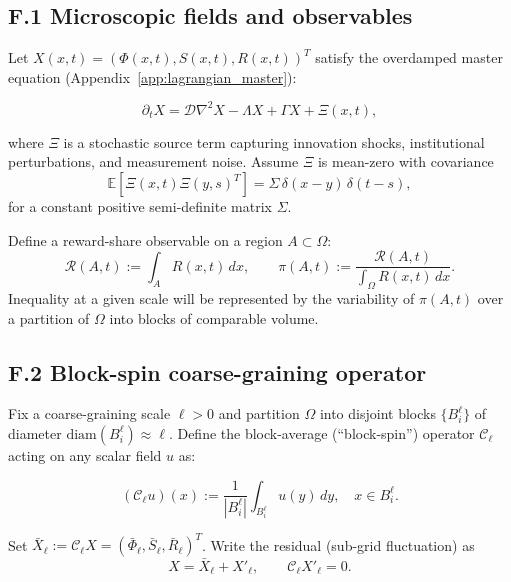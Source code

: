 \documentclass[12pt,a4paper]{article}
\theoremstyle{definition}
\begin{document}
\subsection*{F.1 Microscopic fields and observables}

Let $X(x,t) = (\Phi(x,t), S(x,t), R(x,t))^T$ satisfy the overdamped master equation
(Appendix~\ref{app:lagrangian_master}):

\begin{equation}
  \partial_t X
  =
  \mathcal{D}\nabla^2 X - \Lambda X + \Gamma X + \Xi(x,t),
  \label{eq:micro_master_noise}
\end{equation}

where $\Xi$ is a stochastic source term capturing innovation shocks, institutional perturbations,
and measurement noise.  Assume $\Xi$ is mean-zero with covariance
\begin{equation}
  \mathbb{E}[\Xi(x,t)\Xi(y,s)^T]
  =
  \Sigma\,\delta(x-y)\,\delta(t-s),
  \label{eq:noise_cov}
\end{equation}
for a constant positive semi-definite matrix $\Sigma$.

Define a reward-share observable on a region $A\subset\Omega$:
\begin{equation}
  \mathcal{R}(A,t) := \int_A R(x,t)\,dx,
  \qquad
  \pi(A,t) := \frac{\mathcal{R}(A,t)}{\int_\Omega R(x,t)\,dx}.
  \label{eq:reward_share}
\end{equation}
Inequality at a given scale will be represented by the variability of $\pi(A,t)$ over a partition of $\Omega$
into blocks of comparable volume.

\subsection*{F.2 Block-spin coarse-graining operator}

Fix a coarse-graining scale $\ell>0$ and partition $\Omega$ into disjoint blocks $\{B_i^\ell\}$ of diameter
$\mathrm{diam}(B_i^\ell)\approx \ell$.  Define the block-average (``block-spin'') operator
$\mathcal{C}_\ell$ acting on any scalar field $u$ as:

\begin{equation}
  (\mathcal{C}_\ell u)(x)
  :=
  \frac{1}{|B_i^\ell|}
  \int_{B_i^\ell} u(y)\,dy,
  \quad x\in B_i^\ell.
  \label{eq:block_average}
\end{equation}

Set $\bar{X}_\ell := \mathcal{C}_\ell X = (\bar{\Phi}_\ell,\bar{S}_\ell,\bar{R}_\ell)^T$.
Write the residual (sub-grid fluctuation) as
\begin{equation}
  X = \bar{X}_\ell + X'_\ell,
  \qquad
  \mathcal{C}_\ell X'_\ell = 0.
  \label{eq:decomposition}
\end{equation}
\end{document}
